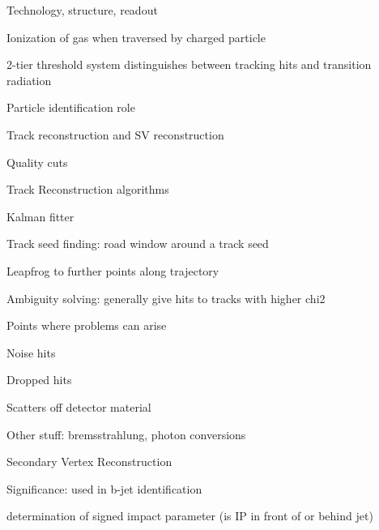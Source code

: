 \documentclass[11pt]{report}
\begin{document}
\begin{outline}
\begin{outline}
\begin{outline}
			\item Technology, structure, readout
			\begin{outline}
				\item Ionization of gas when traversed by charged particle
				\item 2-tier threshold system distinguishes between tracking hits and transition radiation
			\end{outline}
			\item Particle identification role
		\end{outline}
		\item Track reconstruction and SV reconstruction
		\begin{outline}
			\item Quality cuts
			\item Track Reconstruction algorithms %
			\begin{outline}
				\item Kalman fitter
				\item Track seed finding: road window around a track seed
				\item Leapfrog to further points along trajectory
				\item Ambiguity solving: generally give hits to tracks with higher chi2
				\item Points where problems can arise
				\begin{outline}
					\item Noise hits
					\item Dropped hits
					\item Scatters off detector material
					\item Other stuff: bremsstrahlung, photon conversions
				\end{outline}
			\end{outline}
			\item Secondary Vertex Reconstruction
			\begin{outline}
				\item Significance: used in b-jet identification
				\item determination of signed impact parameter (is IP in front of or behind jet)
			\end{outline}
		\end{outline}
	\end{outline}
	

\end{outline}
\end{document}
